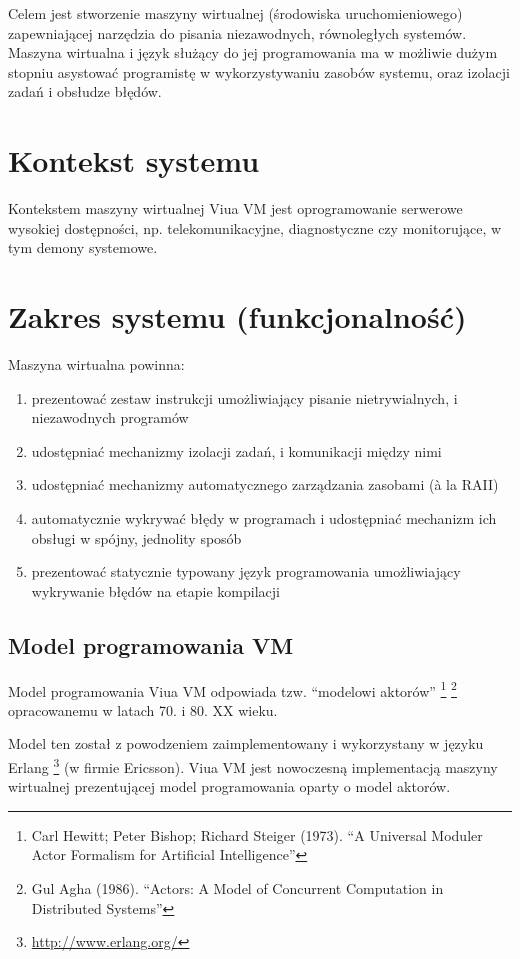\documentclass[11pt,oneside,a4paper,titlepage,onecolumn]{article}
\begin{document}
Celem jest stworzenie maszyny wirtualnej (środowiska uruchomieniowego) zapewniającej narzędzia do
pisania niezawodnych, równoległych systemów. Maszyna wirtualna i język służący do jej programowania
ma w możliwie dużym stopniu asystować programistę w wykorzystywaniu zasobów systemu, oraz
izolacji zadań i obsłudze błędów.

\section{Kontekst systemu}

Kontekstem maszyny wirtualnej Viua VM jest oprogramowanie serwerowe wysokiej dostępności, np.
telekomunikacyjne, diagnostyczne czy monitorujące, w tym demony systemowe.

\section{Zakres systemu (funkcjonalność)}

Maszyna wirtualna powinna:

\begin{enumerate}
    \item prezentować zestaw instrukcji umożliwiający pisanie nietrywialnych, i niezawodnych programów
    \item udostępniać mechanizmy izolacji zadań, i komunikacji między nimi
    \item udostępniać mechanizmy automatycznego zarządzania zasobami (à la RAII)
    \item automatycznie wykrywać błędy w programach i udostępniać mechanizm ich obsługi w spójny, jednolity
        sposób
    \item prezentować statycznie typowany język programowania umożliwiający wykrywanie błędów na etapie
        kompilacji
\end{enumerate}

\subsection{Model programowania VM}

Model programowania Viua VM odpowiada tzw. ``modelowi aktorów''
\footnote{Carl Hewitt; Peter Bishop; Richard Steiger (1973). ``A Universal Moduler Actor Formalism for
Artificial Intelligence''}
\footnote{Gul Agha (1986). ``Actors: A Model of Concurrent Computation in Distributed Systems''}
opracowanemu w latach 70. i 80. XX wieku.

Model ten został z powodzeniem zaimplementowany i wykorzystany w języku Erlang
\footnote{\url{http://www.erlang.org/}} (w firmie Ericsson).
Viua VM jest nowoczesną implementacją maszyny wirtualnej prezentującej model programowania oparty o model
aktorów.
\end{document}
